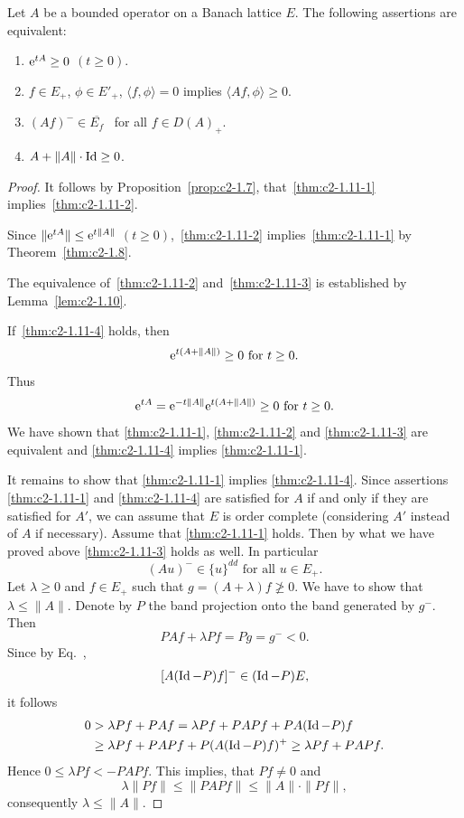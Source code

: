 \begin{theorem}\label{thm:c2-1.11}
%
Let $A$ be a bounded operator on a Banach lattice $E$.
The following assertions are equivalent:
\begin{enumerate}[\upshape (a)] 
\item \label{thm:c2-1.11-1}
$\eu^{tA} \geq 0$ $(t \geq 0)$.
\item \label{thm:c2-1.11-2}
$f \in E_{+}$, $\phi \in E'_{+}$, $\langle f,\phi \rangle = 0$ implies $\langle Af,\phi \rangle \geq 0$.
\item \label{thm:c2-1.11-3}
$(Af)^{-} \in \overline{E_{f}}$ \ for all $f \in D(A)_{+}$.
\item \label{thm:c2-1.11-4}
$A + \|A\| \cdot \Id \geq 0$.
\end{enumerate}
\end{theorem}
\begin{proof}
It follows by Proposition~\ref{prop:c2-1.7},  that~\ref{thm:c2-1.11-1}   implies~\ref{thm:c2-1.11-2}.

Since $\|\eu^{tA}\| \leq \eu^{t\|A\|}$ $(t\geq0)$,~\ref{thm:c2-1.11-2}   implies~\ref{thm:c2-1.11-1}   by Theorem~\ref{thm:c2-1.8}.

The equivalence of~\ref{thm:c2-1.11-2}   and~\ref{thm:c2-1.11-3}   is established by Lemma~\ref{lem:c2-1.10}.

If~\ref{thm:c2-1.11-4} holds, then 
\[
\eu^{t(A+\|A\|)} \geq 0 \text{ for } t\geq 0 .
\]
Thus 
\[
\eu^{tA} = \eu^{-t\|A\|} \eu^{t(A+\|A\|)} \geq 0 \text{ for } t\geq 0 .
\]
We have shown that \ref{thm:c2-1.11-1}, \ref{thm:c2-1.11-2}  and \ref{thm:c2-1.11-3} are equivalent and \ref{thm:c2-1.11-4}  implies \ref{thm:c2-1.11-1}.

It remains to show that \ref{thm:c2-1.11-1}  implies \ref{thm:c2-1.11-4}.
Since assertions \ref{thm:c2-1.11-1}   and \ref{thm:c2-1.11-4}  are satisfied for $A$ if and only if they are satisfied for $A'$, we can assume that $E$ is order complete (considering $A'$ instead of\/ $A$ if necessary).
Assume that \ref{thm:c2-1.11-1}   holds.
Then by what we have proved above \ref{thm:c2-1.11-3}   holds as well.
In particular
\begin{equation}\label{eq:c2-1.9}
(Au)^{-} \in \{u\}^{dd} \text{ for all } u \in E_{+}.
\end{equation}
Let $\lambda \geq 0$ and $f \in E_{+}$ such that $g = (A + \lambda)f \not\geq 0$.
We have to show that $\lambda \leq \|A\|$.
Denote by $P$ the band projection onto the band generated by $g^{-}$.
Then 
\[
PAf + \lambda Pf = Pg = g^{-} < 0 .
\]
Since by  Eq.~, 
\[
[A(\operatorname{Id} - P)f]^{-} \in (\operatorname{Id} - P)E ,
\]
it follows 
\begin{equation*}
    \begin{split}
    0 &> \lambda Pf + PAf = \lambda Pf + PAPf + PA(\Id-P)f \\
    &\geq \lambda Pf + PAPf + P(A(\Id-P)f)^{+} \geq \lambda Pf + PAPf .
    \end{split}
\end{equation*}
Hence $0 \leq \lambda Pf < -PAPf$.
This implies, that $Pf \neq 0$ and 
%
\[
	\lambda\|Pf\| \leq \|PAPf\| \leq \|A\|\cdot\|Pf\| ,
\]
%
consequently $\lambda \leq \|A\|$.
\end{proof}
